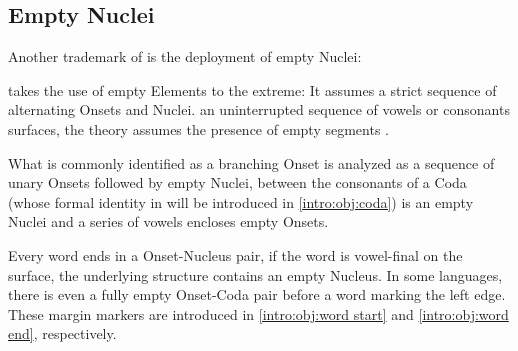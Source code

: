 \subsection{Empty Nuclei}
\label{subsec:intro:empty N}

Another trademark of \SGP is the deployment of
empty Nuclei:

\CVCV takes the use of empty Elements to the extreme:
It assumes a strict sequence of alternating Onsets and Nuclei.
 an uninterrupted sequence of vowels or consonants
surfaces, the theory assumes the presence of empty segments
.

What is commonly identified as a branching Onset is analyzed
as a sequence of unary Onsets followed by empty Nuclei,
between the consonants of a Coda
(whose formal identity in \CVCV will be introduced in \cref{intro:obj:coda})
is an empty Nuclei and a series of vowels encloses empty Onsets.

Every word ends in a Onset-Nucleus pair, if the word is vowel-final on the surface,
the underlying structure contains an empty Nucleus.
In some languages, there is even a fully empty Onset-Coda pair before a word
marking the left edge. These margin markers are introduced in \cref{intro:obj:word start}
and \cref{intro:obj:word end}, respectively.


